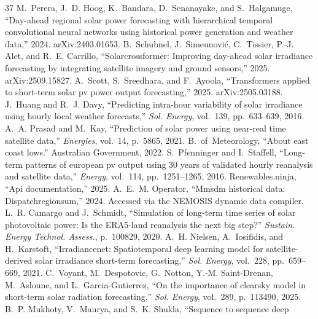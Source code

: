 \begin{thebibliography}{37}
 M.~Perera, J.~D. Hoog, K.~Bandara, D.~Senanayake, and S.~Halgamuge, ``Day-ahead
  regional solar power forecasting with hierarchical temporal convolutional
  neural networks using historical power generation and weather data,'' 2024.
\newblock arXiv:2403.01653.
 B.~Schubnel, J.~Simeunovi\'c, C.~Tissier, P.-J. Alet, and R.~E. Carrillo,
  ``Solarcrossformer: Improving day-ahead solar irradiance forecasting by
  integrating satellite imagery and ground sensors,'' 2025.
\newblock arXiv:2509.15827.
 A.~Scott, S.~Sreedhara, and F.~Ayoola, ``Transformers applied to short-term
  solar pv power output forecasting,'' 2025.
\newblock arXiv:2505.03188.
 J.~Huang and R.~J. Davy, ``Predicting intra-hour variability of solar
  irradiance using hourly local weather forecasts,'' {\em Sol. Energy},
  vol.~139, pp.~633--639, 2016.
 A.~A. Prasad and M.~Kay, ``Prediction of solar power using near-real time
  satellite data,'' {\em Energies}, vol.~14, p.~5865, 2021.
 B.~of~Meteorology, ``About east coast lows.'' Australian Government, 2022.
 S.~Pfenninger and I.~Staffell, ``Long-term patterns of european pv output using
  30 years of validated hourly reanalysis and satellite data,'' {\em Energy},
  vol.~114, pp.~1251--1265, 2016.
 Renewables.ninja, ``Api documentation,'' 2025.
 A.~E.~M. Operator, ``Mmsdm historical data: Dispatchregionsum,'' 2024.
\newblock Accessed via the NEMOSIS dynamic data compiler.
 L.~R. Camargo and J.~Schmidt, ``Simulation of long-term time series of solar photovoltaic power: Is the ERA5-land reanalysis the next big step?'' {\em Sustain. Energy Technol. Assess.}, p.~100829, 2020.
 A.~H. Nielsen, A.~Iosifidis, and H.~Karstoft, ``Irradiancenet: Spatiotemporal
  deep learning model for satellite-derived solar irradiance short-term
  forecasting,'' {\em Sol. Energy}, vol.~228, pp.~659--669, 2021.
 C.~Voyant, M.~Despotovic, G.~Notton, Y.-M. Saint-Drenan, M.~Asloune, and
  L.~Garcia-Gutierrez, ``On the importance of clearsky model in short-term
  solar radiation forecasting,'' {\em Sol. Energy}, vol.~289, p.~113490, 2025.
 B.~P. Mukhoty, V.~Maurya, and S.~K. Shukla, ``Sequence to sequence deep

\end{thebibliography}
